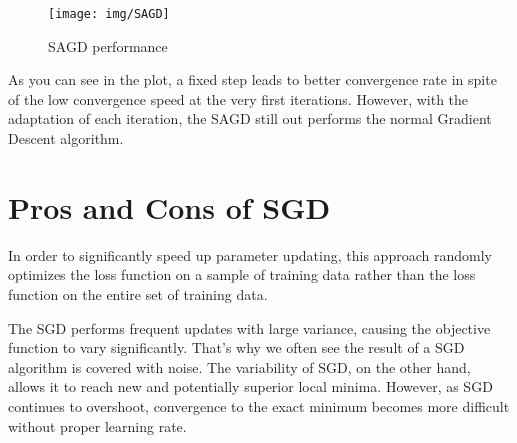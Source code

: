 \documentclass[
  a4paper]{article}
\begin{document}
\begin{figure}

{\centering \texttt{[image: img/SAGD]} 

}

\caption{SAGD performance}\label{fig:unnamed-chunk-5}
\end{figure}

As you can see in the plot, a fixed step leads to better convergence rate in spite of the low convergence speed at the very first iterations. However, with the adaptation of each iteration, the SAGD still out performs the normal Gradient Descent algorithm.

\hypertarget{pros-and-cons-of-sgd}{%
\section{Pros and Cons of SGD}\label{pros-and-cons-of-sgd}}

In order to significantly speed up parameter updating, this approach randomly optimizes the loss function on a sample of training data rather than the loss function on the entire set of training data.

The SGD performs frequent updates with large variance, causing the objective function to vary significantly. That's why we often see the result of a SGD algorithm is covered with noise. The variability of SGD, on the other hand, allows it to reach new and potentially superior local minima. However, as SGD continues to overshoot, convergence to the exact minimum becomes more difficult without proper learning rate.
\end{document}
